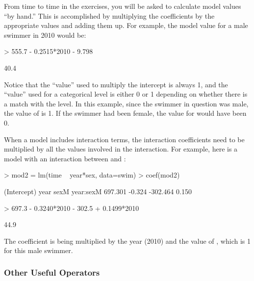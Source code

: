 From time to time in the exercises, you will be asked to calculate
model values ``by hand.''  This is accomplished by multiplying
the coefficients by the appropriate values and adding them up.  For
example, the model value for a male swimmer in 2010 would be:
\begin{Schunk}
\begin{Sinput}
> 555.7 - 0.2515*2010 - 9.798
\end{Sinput}
\begin{Soutput}
[1] 40.4
\end{Soutput}
\end{Schunk}
Notice that the ``value'' used to multiply the intercept is always 1,
and the ``value'' used for a categorical level is either 0 or 1
depending on whether there is a match with the level.  In this example,
since the swimmer in question was male, the value of  is 1.
If the swimmer had been female, the value for
 would have been 0.

When a model includes interaction terms, the interaction coefficients
need to be multiplied by all the values involved in the interaction.
For example, here is a model with an interaction between  and
:
\begin{Schunk}
\begin{Sinput}
> mod2 = lm(time ~ year*sex, data=swim)
> coef(mod2)
\end{Sinput}
\begin{Soutput}
(Intercept)        year        sexM   year:sexM 
    697.301      -0.324    -302.464       0.150 
\end{Soutput}
\begin{Sinput}
> 697.3 - 0.3240*2010 - 302.5 + 0.1499*2010
\end{Sinput}
\begin{Soutput}
[1] 44.9
\end{Soutput}
\end{Schunk}
The  coefficient is being multiplied by the year
(2010) and the value of , which is 1 for this
male swimmer.

\subsubsection*{Other Useful Operators}

